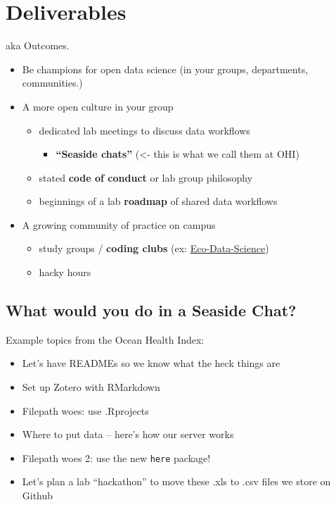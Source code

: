 \documentclass[
  letterpaper,
  DIV=11,
  numbers=noendperiod]{scrreprt}
\providecommand{\tightlist}{%
  \setlength{\itemsep}{0pt}\setlength{\parskip}{0pt}}
\begin{document}
\hypertarget{deliverables}{%
\section{Deliverables}\label{deliverables}}

aka Outcomes.

\begin{itemize}
\tightlist
\item
  Be champions for open data science (in your groups, departments,
  communities.)
\item
  A more open culture in your group

  \begin{itemize}
  \tightlist
  \item
    dedicated lab meetings to discuss data workflows

    \begin{itemize}
    \tightlist
    \item
      \textbf{``Seaside chats''} (\textless- this is what we call them
      at OHI)
    \end{itemize}
  \item
    stated \textbf{code of conduct} or lab group philosophy
  \item
    beginnings of a lab \textbf{roadmap} of shared data workflows
  \end{itemize}
\item
  A growing community of practice on campus

  \begin{itemize}
  \tightlist
  \item
    study groups / \textbf{coding clubs} (ex:
    \href{http://eco-data-science.github.io/}{Eco-Data-Science})
  \item
    hacky hours
  \end{itemize}
\end{itemize}

\hypertarget{what-would-you-do-in-a-seaside-chat}{%
\subsection{What would you do in a Seaside
Chat?}\label{what-would-you-do-in-a-seaside-chat}}

Example topics from the Ocean Health Index:

\begin{itemize}
\tightlist
\item
  Let's have READMEs so we know what the heck things are
\item
  Set up Zotero with RMarkdown
\item
  Filepath woes: use .Rprojects
\item
  Where to put data -- here's how our server works
\item
  Filepath woes 2: use the new \texttt{here} package!
\item
  Let's plan a lab ``hackathon'' to move these .xls to .csv files we
  store on Github
\end{itemize}
\end{document}
